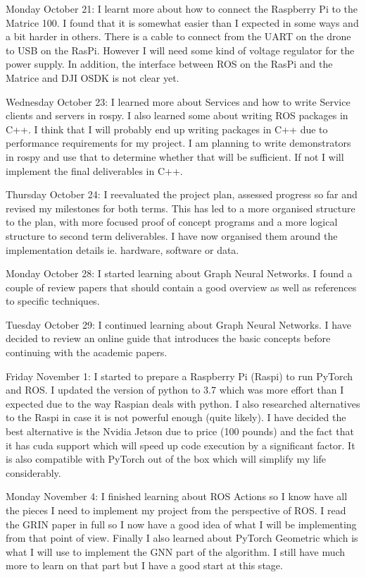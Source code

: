 \documentclass[]{../resources/final_report}
\begin{document}
\begin{appendices}
  Monday October 21: I learnt more about how to connect the Raspberry Pi to the Matrice 100. I found that it is somewhat easier than I expected in some ways and a bit harder in others. There is a cable to connect from the UART on the drone to USB on the RasPi. However I will need some kind of voltage regulator for the power supply. In addition, the interface between ROS on the RasPi and the Matrice and DJI OSDK is not clear yet.
  
  Wednesday October 23: I learned more about Services and how to write Service clients and servers in rospy. I also learned some about writing ROS packages in C++. I think that I will probably end up writing packages in C++ due to performance requirements for my project. I am planning to write demonstrators in rospy and use that to determine whether that will be sufficient. If not I will implement the final deliverables in C++.
  
  Thursday October 24: I reevaluated the project plan, assessed progress so far and revised my milestones for both terms. This has led to a more organised structure to the plan, with more focused proof of concept programs and a more logical structure to second term deliverables. I have now organised them around the implementation details ie. hardware, software or data.
  
  Monday October 28: I started learning about Graph Neural Networks. I found a couple of review papers that should contain a good overview as well as references to specific techniques.
  
  Tuesday October 29: I continued learning about Graph Neural Networks. I have decided to review an online guide that introduces the basic concepts before continuing with the academic papers.
  
  Friday November 1: I started to prepare a Raspberry Pi (Raspi) to run PyTorch and ROS. I updated the version of python to 3.7 which was more effort than I expected due to the way Raspian deals with python. I also researched alternatives to the Raspi in case it is not powerful enough (quite likely). I have decided the best alternative is the Nvidia Jetson due to price (100 pounds) and the fact that it has cuda support which will speed up code execution by a significant factor. It is also compatible with PyTorch out of the box which will simplify my life considerably.
  
  Monday November 4: I finished learning about ROS Actions so I know have all the pieces I need to implement my project from the perspective of ROS. I read the GRIN paper in full so I now have a good idea of what I will be implementing from that point of view. Finally I also learned about PyTorch Geometric which is what I will use to implement the GNN part of the algorithm. I still have much more to learn on that part but I have a good start at this stage.
  

\end{appendices}
\end{document}
